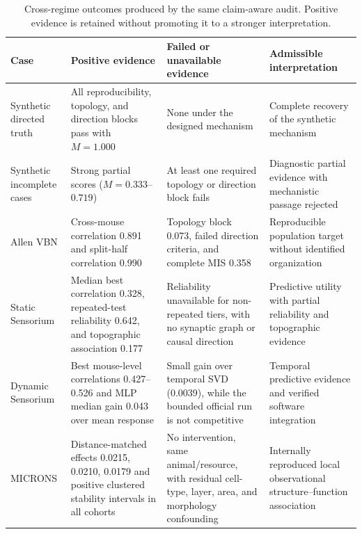 \begin{table}[t]
\centering
\caption{Cross-regime outcomes produced by the same claim-aware audit. Positive
evidence is retained without promoting it to a stronger interpretation.}
\label{tab:cross-regime-results}
\scriptsize
\begin{tabularx}{\textwidth}{@{}p{2.4cm}p{3.3cm}p{3.3cm}X@{}}
\toprule
Case & Positive evidence & Failed or unavailable evidence & Admissible interpretation \\
\midrule
Synthetic directed truth & All reproducibility, topology, and direction blocks pass with $M=1.000$ & None under the designed mechanism & Complete recovery of the synthetic mechanism \\
Synthetic incomplete cases & Strong partial scores ($M=0.333$--$0.719$) & At least one required topology or direction block fails & Diagnostic partial evidence with mechanistic passage rejected \\
Allen VBN & Cross-mouse correlation 0.891 and split-half correlation 0.990 & Topology block 0.073, failed direction criteria, and complete MIS 0.358 & Reproducible population target without identified organization \\
Static Sensorium & Median best correlation 0.328, repeated-test reliability 0.642, and topographic association 0.177 & Reliability unavailable for non-repeated tiers, with no synaptic graph or causal direction & Predictive utility with partial reliability and topographic evidence \\
Dynamic Sensorium & Best mouse-level correlations 0.427--0.526 and MLP median gain 0.043 over mean response & Small gain over temporal SVD (0.0039), while the bounded official run is not competitive & Temporal predictive evidence and verified software integration \\
MICRONS & Distance-matched effects 0.0215, 0.0210, 0.0179 and positive clustered stability intervals in all cohorts & No intervention, same animal/resource, with residual cell-type, layer, area, and morphology confounding & Internally reproduced local observational structure--function association \\
\bottomrule
\end{tabularx}
\end{table}
